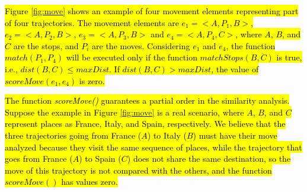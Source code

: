 \documentclass[12pt]{article}
\begin{document}
\hl{Figure {\ref{fig:move}} shows an example of four movement elements representing part of four trajectories. The movement elements are $e_1=<A, P_1, B>$, $e_2=<A, P_2, B>$, $e_3=<A, P_3, B>$ and $e_4=<A, P_4, C>$, where $A$, $B$, and $C$ are the stops, and $P_i$ are the moves. Considering $e_1$ and $e_4$, the function $match(P_1,P_4)$ will be executed only if the function $matchStops(B,C)$ is true, i.e., $dist(B,C) \leq  maxDist$. If $dist(B,C) > maxDist$, the value of $scoreMove(e_1,e_4)$ is zero.
}



\hl{The function \emph{scoreMove()} guarantees a partial order in the similarity analysis. %
Suppose the example in  Figure {\ref{fig:move}} is a real scenario, where $A$, $B$, and $C$ represent  places as France, Italy, and Spain, respectively. We believe that the three trajectories going from France ($A$) to Italy ($B$) must have their move analyzed because they visit the same sequence of places, while the trajectory that goes from France ($A$) to Spain ($C$) does not share the same destination, so the move of this trajectory is not compared with the others, and the function $scoreMove()$ has values zero.}
\end{document}
